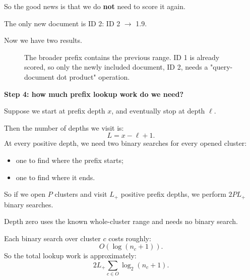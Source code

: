 So the good news is that we do \textbf{not} need to score it again.

The only new document is ID 2: ID 2 $\to$ 1.9.

Now we have two results.

\begin{figure}[htbp]\centering
{}
\caption{The broader prefix contains the previous range. ID 1 is already scored, so only the newly included document, ID 2, needs a "query-document dot product" operation.}
\end{figure}

\textbf{Step 4: how much prefix lookup work do we need?}\par
Suppose we start at prefix depth $x$, and eventually stop at depth $\ell$.

Then the number of depths we visit is:
\[
L=x-\ell+1.
\]
At every positive depth, we need two binary searches for every opened cluster:
\begin{itemize}\setlength{\itemsep}{1pt}
\item one to find where the prefix starts;
\item one to find where it ends.
\end{itemize}
So if we open $P$ clusters and visit $L_+$ positive prefix depths, we perform $2PL_+$ binary searches.

Depth zero uses the known whole-cluster range and needs no binary search.

Each binary search over cluster $c$ costs roughly:
\[
O(\log(n_c+1)).
\]
So the total lookup work is approximately:
\[
2L_+\sum_{c\in O}\log_2(n_c+1).
\]

